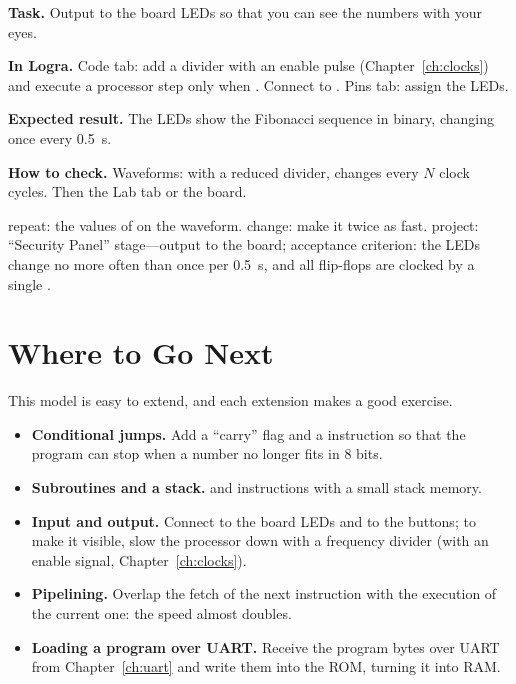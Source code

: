 \begin{diybox}
\textbf{Task.} Output  to the board LEDs so that you can see the numbers with your eyes.

\textbf{In Logra.} Code tab: add a divider with an enable pulse  (Chapter~\ref{ch:clocks}) and execute a processor step only when . Connect  to . Pins tab: assign the LEDs.

\textbf{Expected result.} The LEDs show the Fibonacci sequence in binary, changing once every 0.5~s.

\textbf{How to check.} Waveforms: with a reduced divider,  changes every $N$ clock cycles. Then the Lab tab or the board.

 repeat: the values of  on the waveform.  change: make it twice as fast.  project: ``Security Panel'' stage---output to the board; acceptance criterion: the LEDs change no more often than once per 0.5~s, and all flip-flops are clocked by a single .
\end{diybox}

\section{Where to Go Next}

This model is easy to extend, and each extension makes a good exercise.

\begin{itemize}
  \item \textbf{Conditional jumps.} Add a ``carry'' flag and a  instruction
        so that the program can stop when a number no longer fits in 8 bits.
  \item \textbf{Subroutines and a stack.}  and  instructions with
        a small stack memory.
  \item \textbf{Input and output.} Connect  to the board LEDs and
         to the buttons; to make it visible, slow the processor down with a
        frequency divider (with an enable signal, Chapter~\ref{ch:clocks}).
  \item \textbf{Pipelining.} Overlap the fetch of the next instruction with the
        execution of the current one: the speed almost doubles.
  \item \textbf{Loading a program over UART.} Receive the program bytes over
        UART from Chapter~\ref{ch:uart} and write them into the ROM, turning it into RAM.
\end{itemize}

